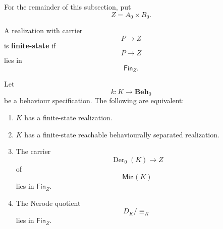 For the remainder of this subsection, put
\[
    Z=A_0\times B_0.
\]

\begin{definition}
\label{def:finite-state-realization}
    A realization with carrier
    \[
        P\to Z
    \]
    is \textbf{finite-state} if
    \[
        P\to Z
    \]
    lies in
    \[
        \mathsf{Fin}_Z.
    \]
\end{definition}

\begin{corollary}
\label{cor:finite-state-myhill-nerode}
    Let
    \[
        k:K\to\mathbf{Beh}_0
    \]
    be a behaviour specification. The following are equivalent:
    \begin{enumerate}
        \item \(K\) has a finite-state realization.

        \item \(K\) has a finite-state reachable behaviourally separated realization.

        \item The carrier
        \[
            \operatorname{Der}_0(K)\to Z
        \]
        of
        \[
            \mathsf{Min}(K)
        \]
        lies in \(\mathsf{Fin}_Z\).

        \item The Nerode quotient
        \[
            D_K/{\equiv_K}
        \]
        lies in \(\mathsf{Fin}_Z\).
    \end{enumerate}
\end{corollary}
